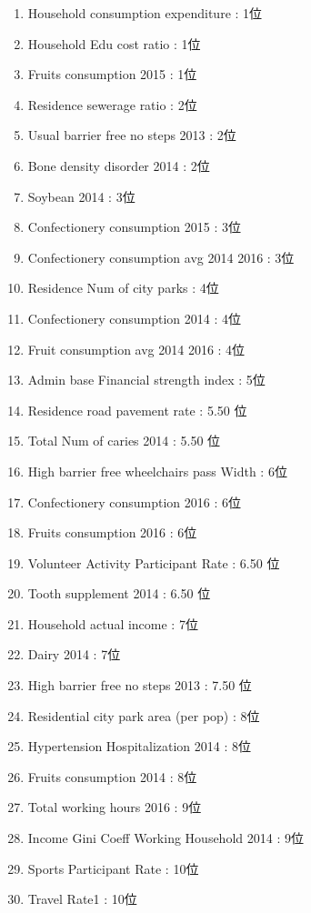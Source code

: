 \begin{multicols}{2}

\begin{enumerate}
	\item Household consumption expenditure : 1位
	\item Household Edu cost ratio : 1位
	\item Fruits consumption 2015 : 1位
	\item Residence sewerage ratio : 2位
	\item Usual barrier free no steps 2013 : 2位
	\item Bone density disorder 2014 : 2位
	\item Soybean 2014 : 3位
	\item Confectionery consumption 2015 : 3位
	\item Confectionery consumption avg 2014 2016 : 3位
	\item Residence Num of city parks : 4位
	\item Confectionery consumption 2014 : 4位
	\item Fruit consumption avg 2014 2016 : 4位
	\item Admin base Financial strength index : 5位
	\item Residence road pavement rate : 5.50 位
	\item Total Num of caries 2014 : 5.50 位
	\item High barrier free wheelchairs pass Width : 6位
	\item Confectionery consumption 2016 : 6位
	\item Fruits consumption 2016 : 6位
	\item Volunteer Activity Participant Rate : 6.50 位
	\item Tooth supplement 2014 : 6.50 位
	\item Household actual income : 7位
	\item Dairy 2014 : 7位
	\item High barrier free no steps 2013 : 7.50 位
	\item Residential city park area (per pop) : 8位
	\item Hypertension Hospitalization 2014 : 8位
	\item Fruits consumption 2014 : 8位
	\item Total working hours 2016 : 9位
	\item Income Gini Coeff Working Household 2014 : 9位
	\item Sports Participant Rate : 10位
	\item Travel Rate1 : 10位

\end{enumerate}
\end{multicols}
